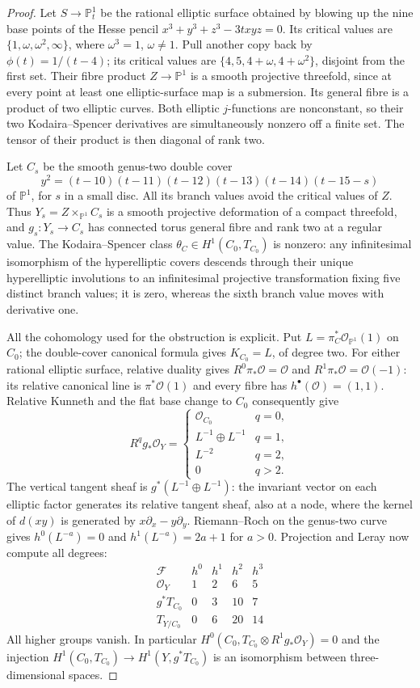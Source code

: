 \begin{proof}
Let $S\to\mathbb P^1_t$ be the rational elliptic surface obtained
by blowing up the nine base points of the Hesse pencil
$x^3+y^3+z^3-3txyz=0$. Its critical values are
$\{1,\omega,\omega^2,\infty\}$, where $\omega^3=1$, $\omega\ne1$.
Pull another copy back by $\phi(t)=1/(t-4)$; its critical values
are $\{4,5,4+\omega,4+\omega^2\}$, disjoint from the first set.
Their fibre product $Z\to\mathbb P^1$ is a smooth projective
threefold, since at every point at least one elliptic-surface
map is a submersion. Its general fibre is a product of two
elliptic curves. Both elliptic $j$-functions are nonconstant,
so their two Kodaira--Spencer derivatives are simultaneously
nonzero off a finite set. The tensor of their product is then
diagonal of rank two.

Let $C_s$ be the smooth genus-two double cover
\[
 y^2=(t-10)(t-11)(t-12)(t-13)(t-14)(t-15-s)
\]
of $\mathbb P^1$, for $s$ in a small disc. All its branch values
avoid the critical values of $Z$. Thus
$Y_s=Z\times_{\mathbb P^1}C_s$ is a smooth projective deformation
of a compact threefold, and $g_s:Y_s\to C_s$ has connected torus
general fibre and rank two at a regular value. The Kodaira--Spencer
class $\theta_C\in H^1(C_0,T_{C_0})$ is nonzero: any infinitesimal
isomorphism of the hyperelliptic covers descends through their
unique hyperelliptic involutions to an infinitesimal projective
transformation fixing five distinct branch values; it is zero,
whereas the sixth branch value moves with derivative one.

All the cohomology used for the obstruction is explicit. Put
$L=\pi_C^*\mathcal O_{\mathbb P^1}(1)$ on $C_0$; the
double-cover canonical formula gives $K_{C_0}=L$, of degree two.
For either rational elliptic surface, relative duality gives
$R^0\pi_*\mathcal O=\mathcal O$ and
$R^1\pi_*\mathcal O=\mathcal O(-1)$: its relative canonical
line is $\pi^*\mathcal O(1)$ and every fibre has
$h^\bullet(\mathcal O)=(1,1)$. Relative Kunneth and the flat
base change to $C_0$ consequently give
\[
 R^qg_*\mathcal O_Y=
 \begin{cases}
  \mathcal O_{C_0}&q=0,\\
  L^{-1}\oplus L^{-1}&q=1,\\
  L^{-2}&q=2,\\
  0&q>2.
 \end{cases}
\]
The vertical tangent sheaf is $g^*(L^{-1}\oplus L^{-1})$:
the invariant vector on each elliptic factor generates its
relative tangent sheaf, also at a node, where the kernel of
$d(xy)$ is generated by $x\partial_x-y\partial_y$.
Riemann--Roch on the genus-two curve gives
$h^0(L^{-a})=0$ and $h^1(L^{-a})=2a+1$ for $a>0$.
Projection and Leray now compute all degrees:
\[
\begin{array}{c|rrrr}
 \mathcal F&h^0&h^1&h^2&h^3\\\hline
 \mathcal O_Y&1&2&6&5\\
 g^*T_{C_0}&0&3&10&7\\
 T_{Y/C_0}&0&6&20&14
\end{array}
\]
All higher groups vanish. In particular
$H^0(C_0,T_{C_0}\otimes R^1g_*\mathcal O_Y)=0$ and the
injection $H^1(C_0,T_{C_0})\to H^1(Y,g^*T_{C_0})$ is an
isomorphism between three-dimensional spaces.


\end{proof}
